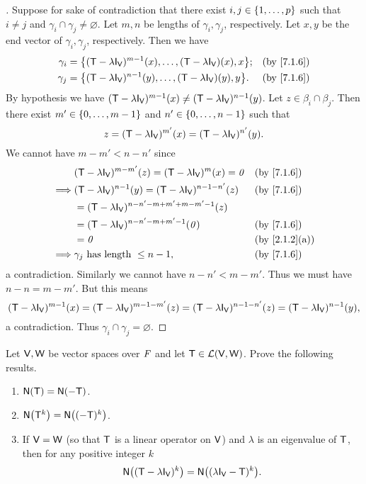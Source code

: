 \begin{proof}[]
  Suppose for sake of contradiction that there exist \(i, j \in \left\lbrace1, \dots, p\right\rbrace\) such that \(i \neq j\) and \(\gamma_i \cap \gamma_j \neq \varnothing\).
  Let \(m, n\) be lengths of \(\gamma_i, \gamma_j\), respectively.
  Let \(x, y\) be the end vector of \(\gamma_i, \gamma_j\), respectively.
  Then we have
  \begin{align*}
    \gamma_i & = \set{(\T - \lambda \IT[\V])^{m - 1}(x), \dots, (\T - \lambda \IT[\V])(x), x}; &  & \by{7.1.6} \\
    \gamma_j & = \set{(\T - \lambda \IT[\V])^{n - 1}(y), \dots, (\T - \lambda \IT[\V])(y), y}. &  & \by{7.1.6}
  \end{align*}
  By hypothesis we have \((\T - \lambda \IT[\V])^{m - 1}(x) \neq (\T - \lambda \IT[\V])^{n - 1}(y)\).
  Let \(z \in \beta_i \cap \beta_j\).
  Then there exist \(m' \in \left\lbrace0, \dots, m - 1\right\rbrace\) and \(n' \in \left\lbrace0, \dots, n - 1\right\rbrace\) such that
  \[
    z = (\T - \lambda \IT[\V])^{m'}(x) = (\T - \lambda \IT[\V])^{n'}(y).
  \]
  We cannot have \(m - m' < n - n'\) since
  \begin{align*}
             & (\T - \lambda \IT[\V])^{m - m'}(z) = (\T - \lambda \IT[\V])^m(x) = \zv     &  & \by{7.1.6}    \\
    \implies & (\T - \lambda \IT[\V])^{n - 1}(y) = (\T - \lambda \IT[\V])^{n - 1 - n'}(z) &  & \by{7.1.6}    \\
             & = (\T - \lambda \IT[\V])^{n - n' - m + m' + m - m' - 1}(z)                                    \\
             & = (\T - \lambda \IT[\V])^{n - n' - m + m' - 1}(\zv)                        &  & \by{7.1.6}    \\
             & = \zv                                                                      &  & \by{2.1.2}[a] \\
    \implies & \gamma_j \text{ has length } \leq n - 1,                                   &  & \by{7.1.6}
  \end{align*}
  a contradiction.
  Similarly we cannot have \(n - n' < m - m'\).
  Thus we must have \(n - n = m - m'\).
  But this means
  \[
    (\T - \lambda \IT[\V])^{m - 1}(x) = (\T - \lambda \IT[\V])^{m - 1 - m'}(z) = (\T - \lambda \IT[\V])^{n - 1 - n'}(z) = (\T - \lambda \IT[\V])^{n - 1}(y),
  \]
  a contradiction.
  Thus \(\gamma_i \cap \gamma_j = \varnothing\).
\end{proof}

\begin{ex}\label{ex:7.1.6}
  Let \(\mathsf{V}, \mathsf{W}\) be vector spaces over \(\mathit{F}\) and let \(\mathsf{T} \in \mathcal{L}(\mathsf{V}, \mathsf{W})\).
  Prove the following results.
  \begin{enumerate}
    \item \(\ns{\T} = \ns{-\T}\).
    \item \(\ns{\T^k} = \ns{(-\T)^k}\).
    \item If \(\mathsf{V} = \mathsf{W}\) (so that \(\mathsf{T}\) is a linear operator on \(\mathsf{V}\)) and \(\lambda\) is an eigenvalue of \(\mathsf{T}\), then for any positive integer \(k\)
          \[
            \ns{(\T - \lambda \IT[\V])^k} = \ns{(\lambda \IT[\V] - \T)^k}.
          \]
  \end{enumerate}
\end{ex}

